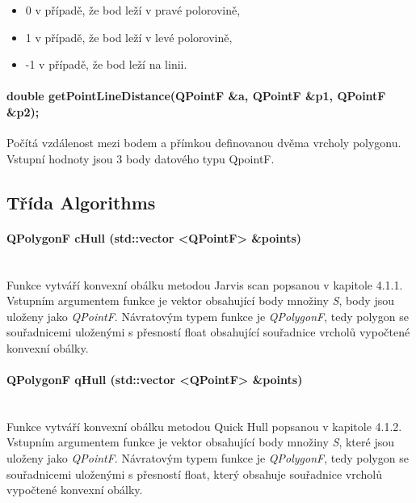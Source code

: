 \documentclass[11pt]{article}
\begin{document}
	\begin{itemize}
		\item 0 v případě, že bod leží v pravé polorovině,
		\item 1 v případě, že  bod leží v levé polorovině,
		\item -1 v případě, že bod leží na linii.
	\end{itemize}
	
	\paragraph{double getPointLineDistance(QPointF \&a, QPointF \&p1, QPointF \&p2);}
	Počítá vzdálenost mezi bodem a přímkou definovanou dvěma vrcholy polygonu. Vstupní hodnoty jsou 3 body datového typu QpointF. 
	
	\subsection{Třída Algorithms}
	\paragraph{QPolygonF cHull (std::vector <QPointF> \&points)}\mbox{}\\
	Funkce vytváří konvexní obálku metodou Jarvis scan popsanou v kapitole 4.1.1. Vstupním argumentem funkce je vektor obsahující body množiny \textit{S}, body jsou uloženy jako \textit{QPointF}. 	Návratovým typem funkce je \textit{QPolygonF}, tedy polygon se souřadnicemi uloženými s přesností float obsahující souřadnice vrcholů vypočtené konvexní obálky.
	
	\paragraph{QPolygonF qHull (std::vector <QPointF> \&points)}\mbox{}\\
	Funkce vytváří konvexní obálku metodou Quick Hull popsanou v kapitole 4.1.2. Vstupním argumentem funkce je vektor obsahující body množiny \textit{S}, které jsou uloženy jako \textit{QPointF}. Návratovým typem funkce je \textit{QPolygonF}, tedy polygon se souřadnicemi uloženými s přesností float, který obsahuje souřadnice vrcholů vypočtené konvexní obálky. 
\end{document}
